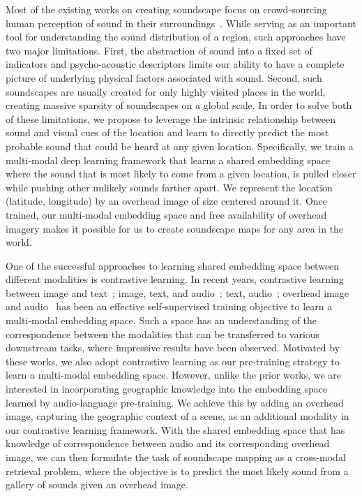 \documentclass{bmvc2k}
\begin{document}
Most of the existing works on creating soundscape focus on crowd-sourcing human perception of sound in their surroundings~\cite{aiello2016chatty,lionello2020systematic,picaut2019open,aramaki2023image,yue2023visualized}. While serving as an important tool for understanding the sound distribution of a region, such approaches have two major limitations. First, the abstraction of sound into a fixed set of indicators and psycho-acoustic descriptors limits our ability to have a complete picture of underlying physical factors associated with sound. Second, such soundscapes are usually created for only highly visited places in the world, creating massive sparsity of soundscapes on a global scale. In order to solve both of these limitations, we propose to leverage the intrinsic relationship between sound and visual cues of the location and learn to directly predict the most probable sound that could be heard at any given location. Specifically, we train a multi-modal deep learning framework that learns a shared embedding space where the sound that is most likely to come from a given location, is pulled closer while pushing other unlikely sounds farther apart. We represent the location (latitude, longitude) by an overhead image of size  centered around it. Once trained, our multi-modal embedding space and free availability of overhead imagery makes it possible for us to create soundscape maps for any area in the world.

One of the successful approaches to learning shared embedding space between different modalities is contrastive learning. In recent years, contrastive learning between image and text~\cite{radford2021learning}; image, text, and audio~\cite{guzhov2022audioclip}; text, audio~\cite{elizalde2023clap,deshmukh2022audio,laionclap2023}; overhead image and audio~\cite{heidler2023self} has been an effective self-supervised training objective to learn a multi-modal embedding space. Such a space has an understanding of the correspondence between the modalities that can be transferred to various downstream tasks, where impressive results have been observed. Motivated by these works, we also adopt contrastive learning as our pre-training strategy to learn a multi-modal embedding space. However, unlike the prior works, we are interested in incorporating geographic knowledge into the embedding space learned by audio-language pre-training. We achieve this by adding an overhead image, capturing the geographic context of a scene, as an additional modality in our contrastive learning framework. With the shared embedding space that has knowledge of correspondence between audio and its corresponding overhead image, we can then formulate the task of soundscape mapping as a cross-modal retrieval problem, where the objective is to predict the most likely sound from a gallery of  sounds given an overhead image.
\end{document}
